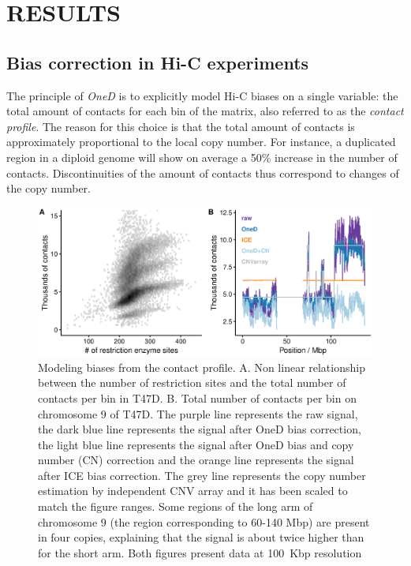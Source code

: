 \documentclass[a4,center,fleqn]{NAR}
\providecommand{\DIFadd}[1]{{\protect\color{red}#1}} %
\providecommand{\DIFdel}[1]{{\protect}}                      %
\providecommand{\DIFaddFL}[1]{\DIFadd{#1}} %
\providecommand{\DIFdelFL}[1]{\DIFdel{#1}} %
\providecommand{\DIFaddbeginFL}{} %
\providecommand{\DIFaddendFL}{} %
\providecommand{\DIFdelbeginFL}{} %
\providecommand{\DIFdelendFL}{} %
\begin{document}
\section{RESULTS}

\subsection{Bias correction in Hi-C experiments}

The principle of \textit{OneD} is to explicitly model Hi-C biases on a
single variable: the total amount of contacts for each bin of the matrix,
also referred to as the \textit{contact profile}. The reason for this
choice is that the total amount of contacts is approximately proportional
to the local copy number. For instance, a duplicated region in a diploid
genome will show on average a 50\% increase in the number of contacts.
Discontinuities of the amount of contacts thus correspond to changes of
the copy number.

\begin{figure}
\centerline{\includegraphics[width=.49\textwidth]
  {figure_1.eps}}
\caption{Modeling biases from the contact profile. A. Non linear
relationship between the number of restriction sites and the total number
of contacts per bin in T47D. B. Total number of contacts per bin on
chromosome \DIFdelbeginFL \DIFdelFL{17 }\DIFdelendFL \DIFaddbeginFL \DIFaddFL{9 }\DIFaddendFL of T47D. The purple line represents the raw signal, the dark blue
line represents the signal after OneD bias correction, the light blue line
represents the signal after OneD bias and copy number (CN) correction and
the orange line represents the signal after ICE bias correction. The \DIFaddbeginFL \DIFaddFL{grey
line represents the copy number estimation by independent CNV array and it
has been scaled to match the figure ranges. Some regions of the }\DIFaddendFL long arm of
chromosome \DIFdelbeginFL \DIFdelFL{17 }\DIFdelendFL \DIFaddbeginFL \DIFaddFL{9 }\DIFaddendFL (the region corresponding to \DIFdelbeginFL \DIFdelFL{20-80 }\DIFdelendFL \DIFaddbeginFL \DIFaddFL{60-140 }\DIFaddendFL Mbp) \DIFdelbeginFL \DIFdelFL{is }\DIFdelendFL \DIFaddbeginFL \DIFaddFL{are }\DIFaddendFL present in four
copies, explaining that the signal is about twice higher than for the short
arm. \DIFaddbeginFL \DIFaddFL{Both figures present data at 100~Kbp resolution}\DIFaddendFL }
\label{fig:totals}
\end{figure}
\end{document}
